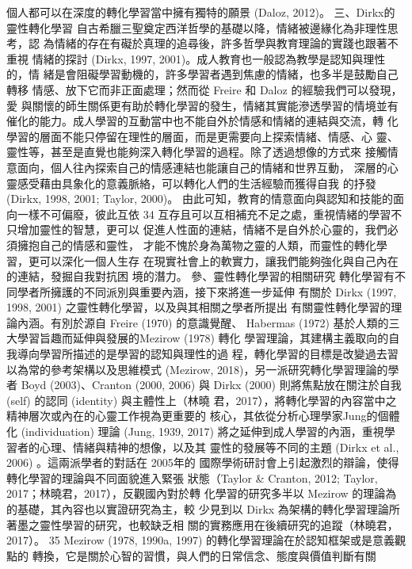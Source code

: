 個人都可以在深度的轉化學習當中擁有獨特的願景 (Daloz, 2012)。 
三、Dirkx的靈性轉化學習 
自古希臘三聖奠定西洋哲學的基礎以降，情緒被邊緣化為非理性思考，認
為情緒的存在有礙於真理的追尋後，許多哲學與教育理論的實踐也跟著不重視
情緒的探討 (Dirkx, 1997, 2001)。成人教育也一般認為教學是認知與理性的，情
緒是會阻礙學習動機的，許多學習者遇到焦慮的情緒，也多半是鼓勵自己轉移
情感、放下它而非正面處理；然而從 Freire 和 Daloz 的經驗我們可以發現，愛
與關懷的師生關係更有助於轉化學習的發生，情緒其實能滲透學習的情境並有
催化的能力。成人學習的互動當中也不能自外於情感和情緒的連結與交流，轉
化學習的層面不能只停留在理性的層面，而是更需要向上探索情緒、情感、心
靈、靈性等，甚至是直覺也能夠深入轉化學習的過程。除了透過想像的方式來
接觸情意面向，個人往內探索自己的情感連結也能讓自己的情緒和世界互動，
深層的心靈感受藉由具象化的意義脈絡，可以轉化人們的生活經驗而獲得自我
的抒發 (Dirkx, 1998, 2001; Taylor, 2000)。 
由此可知，教育的情意面向與認知和技能的面向一樣不可偏廢，彼此互依
34 
互存且可以互相補充不足之處，重視情緒的學習不只增加靈性的智慧，更可以
促進人性面的連結，情緒不是自外於心靈的，我們必須擁抱自己的情感和靈性，
才能不愧於身為萬物之靈的人類，而靈性的轉化學習，更可以深化一個人生存
在現實社會上的軟實力，讓我們能夠強化與自己內在的連結，發掘自我對抗困
境的潛力。 
參、靈性轉化學習的相關研究 
轉化學習有不同學者所擁護的不同派別與重要內涵，接下來將進一步延伸
有關於 Dirkx (1997, 1998, 2001) 之靈性轉化學習，以及與其相關之學者所提出
有關靈性轉化學習的理論內涵。有別於源自 Freire (1970) 的意識覺醒、
Habermas (1972) 基於人類的三大學習旨趣而延伸與發展的Mezirow (1978) 轉化
學習理論，其建構主義取向的自我導向學習所描述的是學習的認知與理性的過
程，轉化學習的目標是改變過去習以為常的參考架構以及思維模式 (Mezirow, 
2018)，另一派研究轉化學習理論的學者 Boyd (2003)、Cranton (2000, 2006) 與
Dirkx (2000) 則將焦點放在關注於自我 (self) 的認同 (identity) 與主體性上（林曉
君，2017），將轉化學習的內容當中之精神層次或內在的心靈工作視為更重要的
核心，其依從分析心理學家Jung的個體化 (individuation) 理論 (Jung, 1939, 2017) 
將之延伸到成人學習的內涵，重視學習者的心理、情緒與精神的想像，以及其
靈性的發展等不同的主題 (Dirkx et al., 2006) 。這兩派學者的對話在 2005年的
國際學術研討會上引起激烈的辯論，使得轉化學習的理論與不同面貌進入緊張
狀態（Taylor & Cranton, 2012; Taylor, 2017；林曉君，2017），反觀國內對於轉
化學習的研究多半以 Mezirow 的理論為的基礎，其內容也以實證研究為主，較
少見到以 Dirkx 為架構的轉化學習理論所著墨之靈性學習的研究，也較缺乏相
關的實務應用在後續研究的追蹤（林曉君，2017）。 
35 
Mezirow (1978, 1990a, 1997) 的轉化學習理論在於認知框架或是意義觀點的
轉換，它是關於心智的習慣，與人們的日常信念、態度與價值判斷有關 
